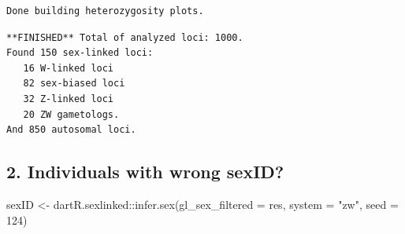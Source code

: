 \documentclass[
  letterpaper,
  DIV=11,
  numbers=noendperiod]{scrreprt}
\newenvironment{Shaded}{\begin{snugshade}}{\end{snugshade}}
\newcommand{\AttributeTok}[1]{\textcolor[rgb]{0.49,0.56,0.16}{#1}}
\newcommand{\DecValTok}[1]{\textcolor[rgb]{0.25,0.63,0.44}{#1}}
\newcommand{\FunctionTok}[1]{\textcolor[rgb]{0.02,0.16,0.49}{#1}}
\newcommand{\NormalTok}[1]{\textcolor[rgb]{0.00,0.44,0.13}{#1}}
\newcommand{\OtherTok}[1]{\textcolor[rgb]{0.00,0.44,0.13}{#1}}
\newcommand{\SpecialCharTok}[1]{\textcolor[rgb]{0.25,0.44,0.63}{#1}}
\newcommand{\StringTok}[1]{\textcolor[rgb]{0.25,0.44,0.63}{#1}}
\let\textttOrig\texttt
\renewcommand{\texttt}[1]{\textttOrig{\color{blue}{#1}}}
\begin{document}
\begin{figure}[H]

{\centering \texttt{[image: Session10\_SexLinkedMarkers\_files/figure-pdf/unnamed-chunk-11-2.pdf]}

}

\end{figure}

\begin{figure}[H]

{\centering \texttt{[image: Session10\_SexLinkedMarkers\_files/figure-pdf/unnamed-chunk-11-3.pdf]}

}

\end{figure}

\begin{verbatim}
Done building heterozygosity plots.
\end{verbatim}

\begin{verbatim}
**FINISHED** Total of analyzed loci: 1000.
Found 150 sex-linked loci:
   16 W-linked loci
   82 sex-biased loci
   32 Z-linked loci
   20 ZW gametologs.
And 850 autosomal loci.
\end{verbatim}

\begin{figure}[H]

{\centering \texttt{[image: Session10\_SexLinkedMarkers\_files/figure-pdf/unnamed-chunk-11-4.pdf]}

}

\end{figure}

\hypertarget{individuals-with-wrong-sexid-1}{%
\subsection*{2. Individuals with wrong
sexID?}\label{individuals-with-wrong-sexid-1}}

\begin{Shaded}
\begin{Highlighting}[]
\NormalTok{sexID }\OtherTok{\textless{}{-}}\NormalTok{ dartR.sexlinked}\SpecialCharTok{::}\FunctionTok{infer.sex}\NormalTok{(}\AttributeTok{gl\_sex\_filtered =}\NormalTok{ res, }\AttributeTok{system =} \StringTok{"zw"}\NormalTok{,}
    \AttributeTok{seed =} \DecValTok{124}\NormalTok{)}
\end{Highlighting}
\end{Shaded}
\end{document}
